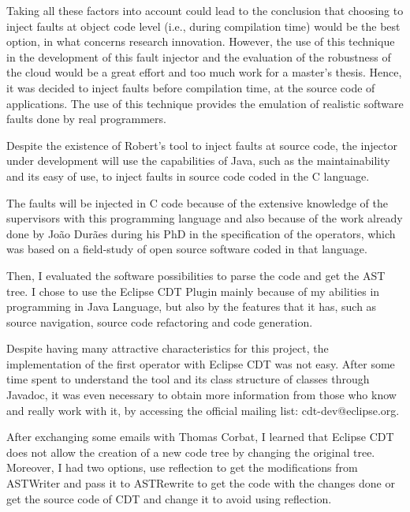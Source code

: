 
Taking all these factors into account could lead to the conclusion that choosing to inject faults at object code level (i.e., during compilation time) would be the best option, in what concerns research innovation. However, the use of this technique in the development of this fault injector and the evaluation of the robustness of the cloud would be a great effort and too much work for a master's thesis. Hence, it was decided to inject faults before compilation time, at the source code of applications. The use of this technique provides the emulation of realistic software faults done by real programmers.

Despite the existence of Robert's tool to inject faults at source code, the injector under development will use the capabilities of Java, such as the maintainability and its easy of use, to inject faults in source code coded in the C language.

The faults will be injected in C code because of the extensive knowledge of the supervisors with this programming language and also because of the work already done by João Durães during his PhD in the specification of the operators, which was based on a field-study of open source software coded in that language.

Then, I evaluated the software possibilities to parse the code and get the AST tree. I chose to use the Eclipse CDT Plugin mainly because of my abilities in programming in Java Language, but also by the features that it has, such as source navigation, source code refactoring and code generation.

Despite having many attractive characteristics for this project, the implementation of the first operator with Eclipse CDT was not easy. After some time spent to understand the tool and its class structure of classes through Javadoc, it was even necessary to obtain more information from those who know and really work with it, by accessing the official mailing list: cdt-dev@eclipse.org.

After exchanging some emails with Thomas Corbat, I learned that Eclipse CDT does not allow the creation of a new code tree by changing the original tree. Moreover, I had two options, use reflection to get the modifications from ASTWriter and pass it to ASTRewrite to get the code with the changes done or get the source code of CDT and change it to avoid using reflection.

